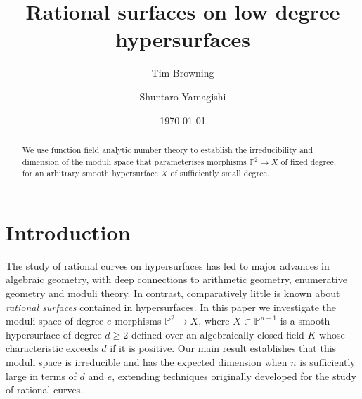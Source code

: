 \documentclass[12pt, reqno]{amsart}
\title[Rational surfaces]{Rational surfaces on low degree hypersurfaces}
\author{Tim Browning}
\author{Shuntaro Yamagishi}
\date{\today}
\numberwithin{equation}{section}
\newcommand{\0}{\mathbf{0}}
\newcommand{\PP}{\mathbb{P}}
\renewcommand{\geq}{\geqslant}
\renewcommand{\=}{\equiv}
\newcommand{\1}{\mathbf{1}}
\theoremstyle{definition}
\begin{document}
\begin{abstract}
We use function field analytic number theory to establish the irreducibility and dimension of the
moduli space that parameterises morphisms $\PP^2\to X$ of fixed degree, for an arbitrary smooth  hypersurface
$X$ of sufficiently small degree.
\end{abstract}


\maketitle
\thispagestyle{empty}



\setcounter{tocdepth}{1}
\tableofcontents

\section{Introduction}\label{s:intro}

The study of rational curves on hypersurfaces has led to major advances in algebraic geometry, with deep connections to arithmetic geometry, enumerative geometry and moduli theory. In contrast, comparatively little is known about  {\em rational surfaces} contained in hypersurfaces. In this paper we investigate the moduli space of degree $e$ morphisms $\PP^2 \to X$, where $X \subset \PP^{n-1}$ is a smooth hypersurface of degree $d \geq 2$ defined over an algebraically closed field $K$ whose characteristic exceeds $d$ if it is positive. Our main result establishes that this moduli space is irreducible and has the expected dimension  when $n$ is sufficiently large in terms of $d$ and $e$, extending techniques originally developed for the study of rational curves.
\end{document}
